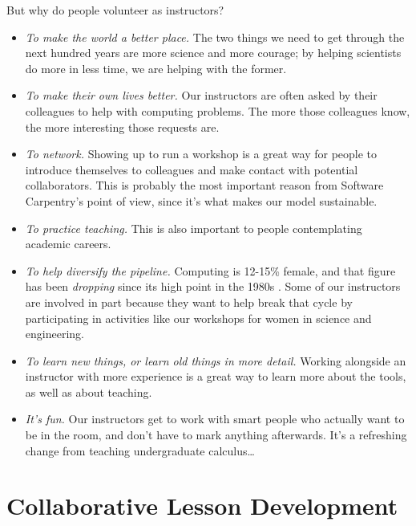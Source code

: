 \documentclass[10pt,a4paper,twocolumn]{article}
\begin{document}
But why do people volunteer as instructors?

\begin{itemize}

\item \emph{To make the world a better place.}  The two things we
  need to get through the next hundred years are more science and more
  courage; by helping scientists do more in less time, we are helping
  with the former.

\item \emph{To make their own lives better.}  Our instructors are
  often asked by their colleagues to help with computing problems.
  The more those colleagues know, the more interesting those requests
  are.

\item \emph{To network.}  Showing up to run a workshop is a great way
  for people to introduce themselves to colleagues and make contact
  with potential collaborators. This is probably the most important
  reason from Software Carpentry's point of view, since it's what
  makes our model sustainable.

\item \emph{To practice teaching.}  This is also important to people
  contemplating academic careers.
 
\item \emph{To help diversify the pipeline.}  Computing is 12-15\%
  female, and that figure has been \emph{dropping} since its high
  point in the 1980s \cite{wic}. Some of our instructors are
  involved in part because they want to help break that cycle by
  participating in activities like our workshops for women in science
  and engineering.

\item \emph{To learn new things, or learn old things in more detail.}
  Working alongside an instructor with more experience is a great way
  to learn more about the tools, as well as about teaching.

\item \emph{It's fun.}  Our instructors get to work with smart people
  who actually want to be in the room, and don't have to mark anything
  afterwards. It's a refreshing change from teaching undergraduate
  calculus\ldots{}

\end{itemize}

\section{Collaborative Lesson Development}\label{s:lesson-collab}
\end{document}

